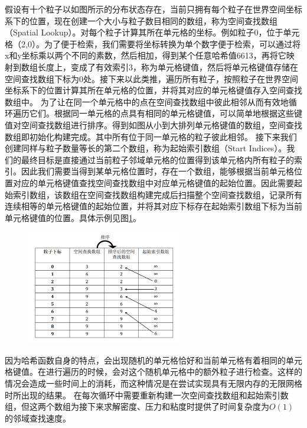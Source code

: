 假设有十个粒子以如图所示的分布状态存在，当前只拥有每个粒子在世界空间坐标系下的位置，现在创建一个大小与粒子数目相同的数组，称为空间查找数组（Spatial Lookup）。对每个粒子计算其所在单元格的坐标。例如粒子0，位于单元格（2,0）。为了便于检索，我们需要将坐标转换为单个数字便于检索，可以通过将x和y坐标乘以两个不同的素数，然后相加，得到某个任意哈希值6613，再将它映射到数组长度上，变成了有效索引3，称为单元格键值，然后将单元格键值存储在空间查找数组下标为0处。接下来以此类推，遍历所有粒子，按照粒子在世界空间坐标系下的位置计算其所在单元格的位置，并将其对应的单元格键值存入空间查找数组中。
为了让在同一个单元格中的点在空间查找数组中彼此相邻从而有效地循环遍历它们。根据同一单元格的点具有相同的单元格键值，可以简单地根据这些键值对空间查找数组进行排序。得到如图从小到大排列单元格键值的数组，空间查找数组即初始化构建完成。其中所有位于同一单元格的粒子彼此相邻。
接下来我们创建同样与粒子数量等长的第二个数组，称为起始索引数组（Start Indices）。我们的最终目标是直接通过当前粒子邻域单元格的位置得到该单元格内所有粒子的索引。因此我们需要当得到某单元格位置时，存在一个数组，能够根据当前单元格位置对应的单元格键值查找空间查找数组中对应单元格键值的起始位置。因此需要起始索引数组，该数组在空间查找数组构建完成后扫描整个空间查找数组，记录所有连续相等的单元格键值的起始位置，并将其对应下标存在起始索引数组下标为当前单元格键值的位置。具体示例见图\ref{fig:gridArray}。
\begin{figure}[ht]
    \centering
    \includegraphics[height=5cm]{image/gridArray.png}
    \label{fig:gridArray}
   \end{figure}
因为哈希函数自身的特点，会出现随机的单元格恰好和当前单元格有着相同的单元格键值。在进行遍历的时候，会对这个随机单元格中的额外粒子进行检查。这样的情况会造成一些时间上的消耗，而这种情况是在尝试实现具有无限内存的无限网格时所出现的结果。
在每次循环中需要重新构建一次空间查找数组和起始索引数组，但这两个数组为接下来求解密度、压力和粘度时提供了时间复杂度为$O(1)$的邻域查找速度。

